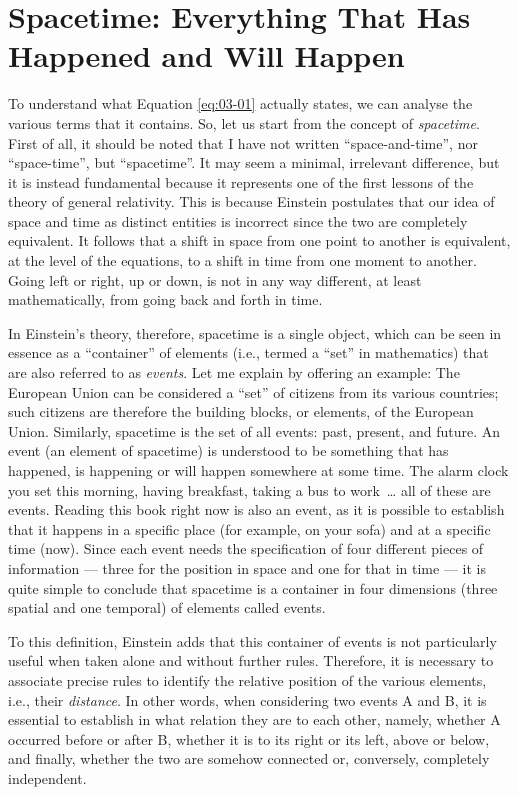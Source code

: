 \section[Spacetime]{Spacetime: Everything That Has Happened and Will Happen}\label{sec:03-spacetime}

To understand what Equation \eqref{eq:03-01} actually states, we can analyse the various terms that
it contains. So, let us start from the concept of \emph{spacetime}. First of all, it
should be noted that I have not written ``space-and-time'', nor ``space-time'', but
``spacetime''. It may seem a minimal, irrelevant difference, but it is instead
fundamental because it represents one of the first lessons of the theory of general
relativity. This is because Einstein postulates that our idea of space and time as
distinct entities is incorrect since the two are completely equivalent. It follows that
a shift in space from one point to another is equivalent, at the level of the equations,
to a shift in time from one moment to another. Going left or right, up or down, is not
in any way different, at least mathematically, from going back and forth in time.

In Einstein's theory, therefore, spacetime is a single object, which can be seen in
essence as a ``container'' of elements (i.e., termed a ``set'' in mathematics) that are
also referred to as \emph{events}. Let me explain by offering an example: The European
Union can be considered a ``set'' of citizens from its various countries; such citizens
are therefore the building blocks, or elements, of the European Union. Similarly,
spacetime is the set of all events: past, present, and future. An
event (an element of spacetime) is understood to be something that
has happened, is happening or will happen somewhere at some time. The alarm clock you
set this morning, having breakfast, taking a bus to work~\ldots{} all of these are
events. Reading this book right now is also an event, as it is possible to establish
that it happens in a specific place (for example, on your sofa) and at a specific time
(now). Since each event needs the specification of four different pieces of information
--- three for the position in space and one for that in time --- it is quite simple to
conclude that spacetime is a container in four dimensions (three spatial and one
temporal) of elements called events.

To this definition, Einstein adds that this container of events is not particularly
useful when taken alone and without further rules. Therefore, it is necessary to
associate precise rules to identify the relative position of the various elements, i.e.,
their \emph{distance}. In other words, when considering two events A and B, it is
essential to establish in what relation they are to each other, namely, whether A
occurred before or after B, whether it is to its right or its left, above or below, and
finally, whether the two are somehow connected or, conversely, completely independent.

